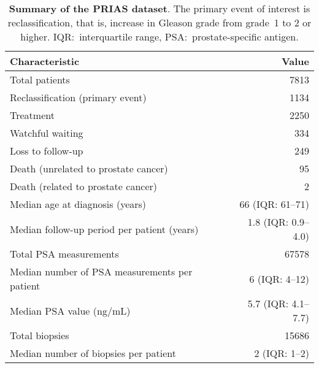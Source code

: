 \begin{table}
\small\sf\centering
\caption{\textbf{Summary of the PRIAS dataset}. The primary event of interest is reclassification, that is, increase in Gleason grade from grade~1 to 2 or higher. IQR:~interquartile range, PSA:~prostate-specific antigen.}
\label{table:prias_summary}
\begin{tabular}{lr}
\toprule
\textbf{Characteristic} & \textbf{Value}\\
\midrule
Total patients & 7813\\
Reclassification (primary event) & 1134\\
Treatment & 2250\\
Watchful waiting & 334\\
Loss to follow-up & 249\\
Death (unrelated to prostate cancer) & 95\\
Death (related to prostate cancer) & 2\\
\midrule
Median age at diagnosis (years) & 66 (IQR: 61--71)\\
Median follow-up period per patient (years) &  1.8 (IQR: 0.9--4.0)\\
Total PSA measurements & 67578\\
Median number of PSA measurements per patient &  6 (IQR: 4--12)\\
Median PSA value (ng/mL) & 5.7 (IQR: 4.1--7.7)\\
Total biopsies & 15686\\
Median number of biopsies per patient &  2 (IQR: 1--2)\\
\bottomrule
\end{tabular}
\end{table}